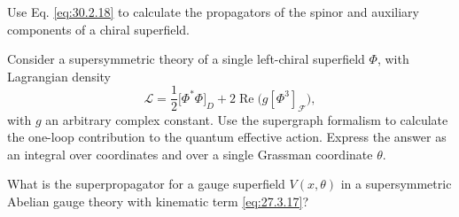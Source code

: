 
\begin{enumerate}
   Use Eq. \eqref{eq:30.2.18} to calculate the propagators of the
  spinor and auxiliary components of a chiral superfield.

   Consider a supersymmetric theory of a single left-chiral
  superfield $\Phi$, with Lagrangian density
  \[
    \mathcal{L}
    = \frac{1}{2}\bigl[\Phi^*\Phi\bigr]_D
      +2\operatorname{Re}\bigl(g[\Phi^3]_{\mathcal{F}}\bigr),
  \]
  with $g$ an arbitrary complex constant. Use the supergraph formalism
  to calculate the one-loop contribution to the quantum effective
  action. Express the answer as an integral over coordinates and over a
  single Grassman coordinate $\theta$.

   What is the superpropagator for a gauge superfield $V(x,\theta)$
  in a supersymmetric Abelian gauge theory with kinematic term
  \eqref{eq:27.3.17}?
\end{enumerate}
